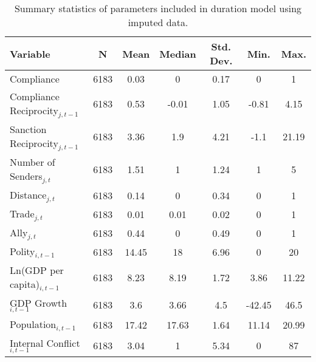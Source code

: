 \begin{table}[ht]
\centering
{\normalsize
\begin{tabular}{lcccccc}
 Variable & N & Mean & Median & Std. Dev. & Min. & Max. \\ 
  \hline
\hline
Compliance & 6183 & 0.03 & 0 & 0.17 & 0 & 1 \\ 
  Compliance Reciprocity$_{j,t-1}$ & 6183 & 0.53 & -0.01 & 1.05 & -0.81 & 4.15 \\ 
  Sanction Reciprocity$_{j,t-1}$ & 6183 & 3.36 & 1.9 & 4.21 & -1.1 & 21.19 \\ 
  Number of Senders$_{j,t}$ & 6183 & 1.51 & 1 & 1.24 & 1 & 5 \\ 
  Distance$_{j,t}$ & 6183 & 0.14 & 0 & 0.34 & 0 & 1 \\ 
  Trade$_{j,t}$ & 6183 & 0.01 & 0.01 & 0.02 & 0 & 1 \\ 
  Ally$_{j,t}$ & 6183 & 0.44 & 0 & 0.49 & 0 & 1 \\ 
  Polity$_{i,t-1}$ & 6183 & 14.45 & 18 & 6.96 & 0 & 20 \\ 
  Ln(GDP per capita)$_{i,t-1}$ & 6183 & 8.23 & 8.19 & 1.72 & 3.86 & 11.22 \\ 
  GDP Growth$_{i,t-1}$ & 6183 & 3.6 & 3.66 & 4.5 & -42.45 & 46.5 \\ 
  Population$_{i,t-1}$ & 6183 & 17.42 & 17.63 & 1.64 & 11.14 & 20.99 \\ 
  Internal Conflict$_{i,t-1}$ & 6183 & 3.04 & 1 & 5.34 & 0 & 87 \\ 
   \hline
\hline
\end{tabular}
}
\caption{Summary statistics of parameters included in duration model using imputed data.} 
\label{tab:summImp}
\end{table}
